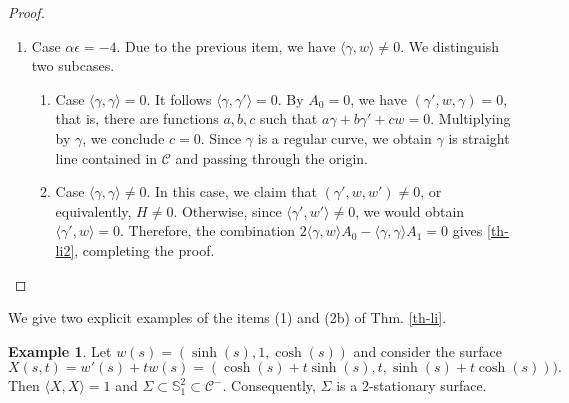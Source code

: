 \documentclass[a4paper,12pt]{amsart}
\theoremstyle{definition}
\newtheorem{example}[theorem]{Example}
\def\s{\mathbb S}
\begin{document}
\begin{proof}
\begin{enumerate}
\item Case  $\alpha\epsilon = -4$. Due to the previous item, we have $\langle \gamma,w\rangle\neq 0$. We distinguish two subcases.
\begin{enumerate}
\item Case  $\langle \gamma, \gamma \rangle = 0$. It follows  $\langle \gamma, \gamma' \rangle =0$. By $A_0=0$, we have $(\gamma',w,\gamma)=0$, that is, there are functions $a,b,c$ such that $a\gamma+b\gamma'+cw=0$. Multiplying by $\gamma$, we conclude $c=0$. Since $\gamma$ is a regular curve, we obtain $\gamma$ is straight line contained in $\mathcal{C}$ and passing through the origin.

\item Case  $\langle \gamma, \gamma \rangle \neq 0$. In this case, we claim that $(\gamma',w,w') \neq 0$, or equivalently, $H\neq 0$. Otherwise, since $\langle \gamma',w'\rangle \neq 0 $, we would obtain $\langle \gamma',w\rangle =0 $. Therefore, the combination $2\langle \gamma,w\rangle A_0-\langle \gamma,\gamma \rangle A_1=0$ gives \eqref{th-li2}, completing the proof.
\end{enumerate}
\end{enumerate}
\end{proof}

We give two explicit examples of the items (1) and (2b) of Thm. \ref{th-li}.

\begin{example} Let $w(s)=(\sinh(s),1,\cosh(s))$ and consider the surface  
$$X(s,t)=w'(s)+tw(s)=( \cosh (s)+t \sinh (s),t,\sinh (s)+t\cosh(s))
).$$
Then $\langle X,X\rangle=1$ and $\Sigma\subset\s^2_1\subset\mathcal{C}^-$. Consequently, $\Sigma$ is a  $2$-stationary surface. 
\end{example}
\end{document}
